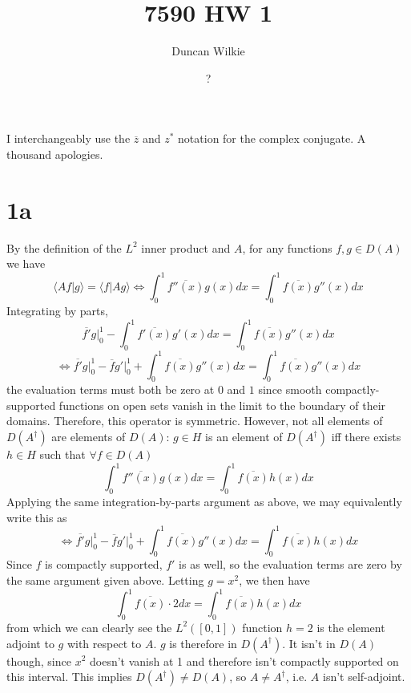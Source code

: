 \message{ !name(hw1.tex)}\documentclass{article}
\title{7590 HW 1}
\author{Duncan Wilkie}
\date{?}
\begin{document}


\maketitle

I interchangeably use the $\overline{z}$ and $z^{*}$ notation for the complex conjugate.
A thousand apologies.
\section*{1a}
By the definition of the $L^2$ inner product and $A$, for any functions $f,g\in D(A)$ we have
\[\langle Af|g \rangle=\langle f|Ag \rangle\Leftrightarrow \int_0^1\overline{f''(x)}g(x)dx=\int_0^1\overline{f(x)}g''(x)dx \]
Integrating by parts,
\[\overline{f'}g\bigg|_0^1-\int_0^1\overline{f'(x)}g'(x)dx=\int_0^1\overline{f(x)}g''(x)dx\]
\[\Leftrightarrow \overline{f'}g\bigg|_0^1-\overline{f}g'\bigg|_0^1+\int_0^1\overline{f(x)}g''(x)dx=\int_0^1\overline{f(x)}g''(x)dx\]
the evaluation terms  must both be zero at $0$ and $1$ since smooth compactly-supported functions on open sets vanish
in the limit to the boundary of their domains. %
Therefore, this operator is symmetric.
However, not all elements of $D(A^{\dagger})$ are elements of $D(A)$: $g\in H$ is an element of $D(A^{\dagger})$ iff there exists
$h\in H$ such that $\forall f\in D(A)$
\[
  \int_{0}^{1}\overline{f''(x)}g(x)dx=\int_{0}^{1}\overline{f(x)}h(x)dx
\]
Applying the same integration-by-parts argument as above, we may equivalently write this as
\[\Leftrightarrow \overline{f'}g\bigg|_0^1-\overline{f}g'\bigg|_0^1+\int_0^1\overline{f(x)}g''(x)dx=\int_0^1\overline{f(x)}h(x)dx\]
Since $f$ is compactly supported, $f'$ is as well, so the evaluation terms are zero by the same argument given above.
Letting $g=x^{2}$, we then have
\[\int_{0}^{1}\overline{f(x)}\cdot 2dx=\int_{0}^{1}\overline{f(x)}h(x)dx\]
from which we can clearly see the $L^{2}([0,1])$ function $h=2$ is the element adjoint to $g$ with respect to $A$.
$g$ is therefore in $D(A^{\dagger})$.
It isn't in $D(A)$ though, since $x^{2}$ doesn't vanish at 1 and therefore isn't compactly supported on this interval.
This implies $D(A^{\dagger})\neq D(A)$, so $A\neq A^{\dagger}$, i.e. $A$ isn't self-adjoint.
\end{document}
